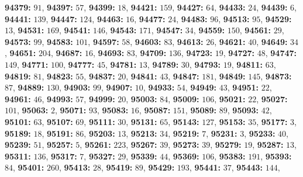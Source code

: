 \textsf{\bfseries 94379:} $91$, \textsf{\bfseries 94397:} $57$, \textsf{\bfseries 94399:} $18$, \textsf{\bfseries 94421:} $159$, \textsf{\bfseries 94427:} $64$, \textsf{\bfseries 94433:} $24$, \textsf{\bfseries 94439:} $6$, \textsf{\bfseries 94441:} $139$, \textsf{\bfseries 94447:} $124$, \textsf{\bfseries 94463:} $16$, \textsf{\bfseries 94477:} $24$, \textsf{\bfseries 94483:} $96$, \textsf{\bfseries 94513:} $95$, \textsf{\bfseries 94529:} $13$, \textsf{\bfseries 94531:} $169$, \textsf{\bfseries 94541:} $146$, \textsf{\bfseries 94543:} $171$, \textsf{\bfseries 94547:} $34$, \textsf{\bfseries 94559:} $150$, \textsf{\bfseries 94561:} $29$, \textsf{\bfseries 94573:} $99$, \textsf{\bfseries 94583:} $101$, \textsf{\bfseries 94597:} $58$, \textsf{\bfseries 94603:} $83$, \textsf{\bfseries 94613:} $26$, \textsf{\bfseries 94621:} $40$, \textsf{\bfseries 94649:} $34$, \textsf{\bfseries 94651:} $204$, \textsf{\bfseries 94687:} $16$, \textsf{\bfseries 94693:} $83$, \textsf{\bfseries 94709:} $136$, \textsf{\bfseries 94723:} $19$, \textsf{\bfseries 94727:} $48$, \textsf{\bfseries 94747:} $149$, \textsf{\bfseries 94771:} $100$, \textsf{\bfseries 94777:} $45$, \textsf{\bfseries 94781:} $13$, \textsf{\bfseries 94789:} $30$, \textsf{\bfseries 94793:} $19$, \textsf{\bfseries 94811:} $63$, \textsf{\bfseries 94819:} $81$, \textsf{\bfseries 94823:} $55$, \textsf{\bfseries 94837:} $20$, \textsf{\bfseries 94841:} $43$, \textsf{\bfseries 94847:} $181$, \textsf{\bfseries 94849:} $145$, \textsf{\bfseries 94873:} $87$, \textsf{\bfseries 94889:} $130$, \textsf{\bfseries 94903:} $99$, \textsf{\bfseries 94907:} $10$, \textsf{\bfseries 94933:} $54$, \textsf{\bfseries 94949:} $43$, \textsf{\bfseries 94951:} $22$, \textsf{\bfseries 94961:} $46$, \textsf{\bfseries 94993:} $57$, \textsf{\bfseries 94999:} $20$, \textsf{\bfseries 95003:} $84$, \textsf{\bfseries 95009:} $106$, \textsf{\bfseries 95021:} $22$, \textsf{\bfseries 95027:} $101$, \textsf{\bfseries 95063:} $2$, \textsf{\bfseries 95071:} $93$, \textsf{\bfseries 95083:} $16$, \textsf{\bfseries 95087:} $151$, \textsf{\bfseries 95089:} $89$, \textsf{\bfseries 95093:} $42$, \textsf{\bfseries 95101:} $63$, \textsf{\bfseries 95107:} $69$, \textsf{\bfseries 95111:} $30$, \textsf{\bfseries 95131:} $65$, \textsf{\bfseries 95143:} $127$, \textsf{\bfseries 95153:} $35$, \textsf{\bfseries 95177:} $3$, \textsf{\bfseries 95189:} $18$, \textsf{\bfseries 95191:} $86$, \textsf{\bfseries 95203:} $13$, \textsf{\bfseries 95213:} $34$, \textsf{\bfseries 95219:} $7$, \textsf{\bfseries 95231:} $3$, \textsf{\bfseries 95233:} $40$, \textsf{\bfseries 95239:} $51$, \textsf{\bfseries 95257:} $5$, \textsf{\bfseries 95261:} $223$, \textsf{\bfseries 95267:} $39$, \textsf{\bfseries 95273:} $39$, \textsf{\bfseries 95279:} $19$, \textsf{\bfseries 95287:} $13$, \textsf{\bfseries 95311:} $136$, \textsf{\bfseries 95317:} $7$, \textsf{\bfseries 95327:} $29$, \textsf{\bfseries 95339:} $44$, \textsf{\bfseries 95369:} $106$, \textsf{\bfseries 95383:} $191$, \textsf{\bfseries 95393:} $84$, \textsf{\bfseries 95401:} $260$, \textsf{\bfseries 95413:} $28$, \textsf{\bfseries 95419:} $89$, \textsf{\bfseries 95429:} $193$, \textsf{\bfseries 95441:} $37$, \textsf{\bfseries 95443:} $144$, 
